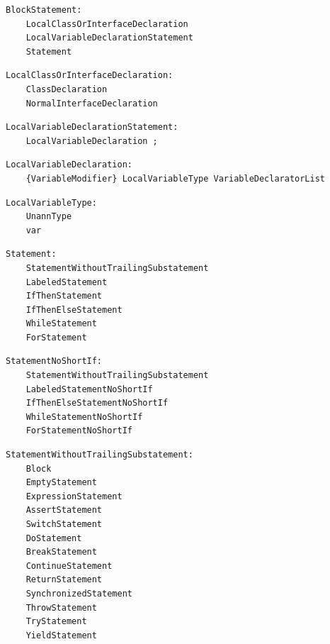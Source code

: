 \noindent\textbf{\texttt{}}\par
\begin{lstlisting}
BlockStatement:
    LocalClassOrInterfaceDeclaration
    LocalVariableDeclarationStatement
    Statement
\end{lstlisting}

\noindent\textbf{\texttt{}}\par
\begin{lstlisting}
LocalClassOrInterfaceDeclaration:
    ClassDeclaration
    NormalInterfaceDeclaration
\end{lstlisting}

\noindent\textbf{\texttt{}}\par
\begin{lstlisting}
LocalVariableDeclarationStatement:
    LocalVariableDeclaration ;
\end{lstlisting}

\noindent\textbf{\texttt{}}\par
\begin{lstlisting}
LocalVariableDeclaration:
    {VariableModifier} LocalVariableType VariableDeclaratorList
\end{lstlisting}

\noindent\textbf{\texttt{}}\par
\begin{lstlisting}
LocalVariableType:
    UnannType
    var
\end{lstlisting}

\noindent\textbf{\texttt{}}\par
\begin{lstlisting}
Statement:
    StatementWithoutTrailingSubstatement
    LabeledStatement
    IfThenStatement
    IfThenElseStatement
    WhileStatement
    ForStatement
\end{lstlisting}

\noindent\textbf{\texttt{}}\par
\begin{lstlisting}
StatementNoShortIf:
    StatementWithoutTrailingSubstatement
    LabeledStatementNoShortIf
    IfThenElseStatementNoShortIf
    WhileStatementNoShortIf
    ForStatementNoShortIf
\end{lstlisting}

\noindent\textbf{\texttt{}}\par
\begin{lstlisting}
StatementWithoutTrailingSubstatement:
    Block
    EmptyStatement
    ExpressionStatement
    AssertStatement
    SwitchStatement
    DoStatement
    BreakStatement
    ContinueStatement
    ReturnStatement
    SynchronizedStatement
    ThrowStatement
    TryStatement
    YieldStatement
\end{lstlisting}

